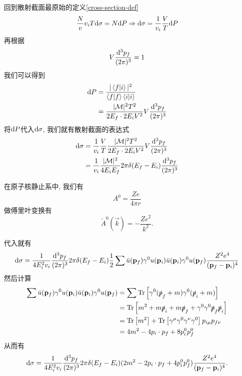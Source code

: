 \begin{example}
    回到散射截面最原始的定义\ref{cross-section-def}
    \begin{equation}
        \frac Nv v_i T\d\sigma=N\d P\Rightarrow \d\sigma=\frac1{v_i}\frac VT\d P
    \end{equation}
    再根据
    \begin{equation}
        V\ddd{p_f}=1
    \end{equation}
    我们可以得到
    \begin{align}
        \d P&=\frac{|\braket{f|i}|^2}{\braket{f|f}\braket{i|i}}\\
        &=\frac{|\mathcal M|^2 T^2}{2E_f\cdot2E_iV^2}V\ddd{p_f}
    \end{align}
    将$\d P$代入$\d\sigma$, 我们就有散射截面的表达式
    \begin{align}
        \d\sigma&=\frac{1}{v_i}\frac VT\frac{|\mathcal M|^2 T^2}{2E_f\cdot2E_iV^2}V\ddd{p_f}\\
        &=\frac{1}{v_i}\frac{|\mathcal M|^2}{4E_iE_f}2\pi\delta(E_f-E_i)\ddd{p_f}
    \end{align}

    在原子核静止系中, 我们有
    \begin{equation}
        A^0=\frac{Ze}{4\pi r}
    \end{equation}
    做傅里叶变换有
    \begin{equation}
        \tilde A^0(\vec k)=-\frac{Ze^2}{k^2}.
    \end{equation}

    代入就有
    \begin{equation}
        \d\sigma=\frac1{4E_i^2v_i}\ddd{p_f}2\pi\delta(E_f-E_i)\frac12\sum\bar u(\vec p_f)\gamma^0u(\vec p_i)\bar u(\vec p_i)\gamma^0u(\vec p_f)\frac{Z^2e^4}{(\vec p_f-\vec p_i)^4}
    \end{equation}
    然后计算
    \begin{align}
        \sum\bar u(\vec p_f)\gamma^0u(\vec p_i)\bar u(\vec p_i)\gamma^0u(\vec p_f)&=\sum\rm{Tr}\left[\gamma^0(\slashed p_f+m)\gamma^0(\slashed p_i+m)\right]\\
        &=\rm{Tr}\left[m^2+m\slashed p_i+m\slashed p_f+\gamma^0\gamma^0\slashed p_f\slashed p_i\right]\\
        &=\rm{Tr}\left[m^2\right]+\rm{Tr}\left[\gamma^\mu\gamma^0\gamma^\nu\gamma^0\right]p_{i\mu}p_{f\nu}\\
        &=4m^2-4p_i\cdot p_f+8p_i^0p_f^0
    \end{align}
    从而有
    \begin{equation}
        \d\sigma=\frac1{4E_i^2v_i}\ddd{p_f}2\pi\delta(E_f-E_i)(2m^2-2p_i\cdot p_f+4p_i^0p_f^0)\frac{Z^2e^4}{(\vec p_f-\vec p_i)^4}.
    \end{equation}


\end{example}
